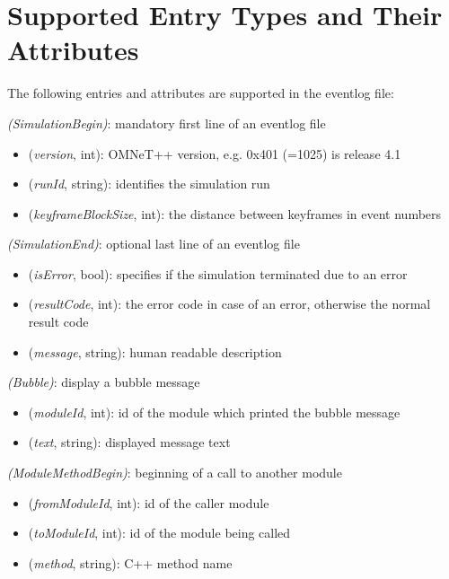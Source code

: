 \section{Supported Entry Types and Their Attributes}
\label{sec:eventlog-file-format:entry-types}

The following entries and attributes are supported in the eventlog file:


 \textit{(SimulationBegin)}: mandatory first line of an eventlog file

\begin{itemize}
  \item {} (\textit{version}, int): OMNeT++ version, e.g. 0x401 (=1025) is release 4.1
  \item {} (\textit{runId}, string): identifies the simulation run
  \item {} (\textit{keyframeBlockSize}, int): the distance between keyframes in event numbers
\end{itemize}

 \textit{(SimulationEnd)}: optional last line of an eventlog file

\begin{itemize}
  \item {} (\textit{isError}, bool): specifies if the simulation terminated due to an error
  \item {} (\textit{resultCode}, int): the error code in case of an error, otherwise the normal result code
  \item {} (\textit{message}, string): human readable description
\end{itemize}

 \textit{(Bubble)}: display a bubble message

\begin{itemize}
  \item {} (\textit{moduleId}, int): id of the module which printed the bubble message
  \item {} (\textit{text}, string): displayed message text
\end{itemize}

 \textit{(ModuleMethodBegin)}: beginning of a call to another module

\begin{itemize}
  \item {} (\textit{fromModuleId}, int): id of the caller module
  \item {} (\textit{toModuleId}, int): id of the module being called
  \item {} (\textit{method}, string): C++ method name
\end{itemize}

